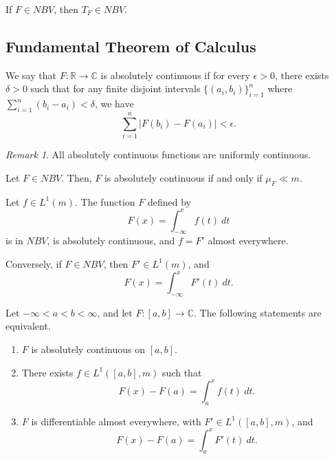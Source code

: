 \documentclass[11pt]{article}
\renewcommand{\C}{\mathbb{C}}
\newcommand{\R}{\mathbb{R}}
\theoremstyle{definition}
\theoremstyle{remark}
\newtheorem*{remark}{Remark}
\begin{document}
    \begin{corollary}
        If $F \in NBV$, then $T_F \in NBV$.
    \end{corollary}


    \subsection{Fundamental Theorem of Calculus}

    \begin{definition}
        We say that $F\colon \R \to \C$ is absolutely continuous if for every
        $\epsilon > 0$, there exists $\delta > 0$ such that for any finite disjoint
        intervals $\{(a_i, b_i)\}_{i = 1}^n$ where $\sum_{i = 1}^n (b_i - a_i) <
        \delta$, we have \[
            \sum_{i = 1}^n |F(b_i) - F(a_i)| < \epsilon.
        \]

        \begin{remark}
            All absolutely continuous functions are uniformly continuous.
        \end{remark}
    \end{definition}

    \begin{lemma}
        Let $F \in NBV$. Then, $F$ is absolutely continuous if and only if $\mu_F \ll
        m$.
    \end{lemma}

    \begin{corollary}
        Let $f \in L^1(m)$. The function $F$ defined by \[
            F(x) = \int_{-\infty}^x f(t)\:dt
        \] is in $NBV$, is absolutely continuous, and $f = F'$ almost everywhere.

        Conversely, if $F \in NBV$, then $F' \in L^1(m)$, and \[
            F(x) = \int_{-\infty}^x F'(t)\:dt.
        \]
    \end{corollary}

    \begin{theorem}
        Let $-\infty < a < b < \infty$, and let $F\colon [a, b] \to \C$. The
        following statements are equivalent. \begin{enumerate}
            \item $F$ is absolutely continuous on $[a, b]$.
            \item There exists $f \in L^1([a, b], m)$ such that \[
                F(x) - F(a) = \int_a^x f(t)\:dt.
            \]
            \item $F$ is differentiable almost everywhere, with $F' \in L^1([a, b],
            m)$, and \[
                F(x) - F(a) = \int_a^x F'(t)\:dt.
            \]
        \end{enumerate}
    \end{theorem}
\end{document}

